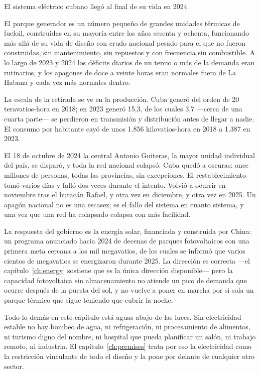 El sistema eléctrico cubano llegó al final de su vida en 2024.

El parque generador es un número pequeño de grandes unidades térmicas de fueloil,
construidas en su mayoría entre los años sesenta y ochenta, funcionando más allá de
su vida de diseño con crudo nacional pesado para el que no fueron construidas, sin
mantenimiento, sin repuestos y con frecuencia sin combustible. A lo largo de 2023 y
2024 los déficits diarios de un tercio o más de la demanda eran rutinarios, y los
apagones de doce a veinte horas eran normales fuera de La Habana y cada vez más
normales dentro.

La escala de la retirada se ve en la producción. Cuba generó del orden de 20
teravatios-hora en 2018; en 2023 generó 15,3, de los cuales 3,7 ---cerca de una
cuarta parte--- se perdieron en transmisión y distribución antes de llegar a
nadie.\unv{} El consumo por habitante cayó de unos 1.856 kilovatios-hora en 2018 a
1.387 en 2023.

El 18 de octubre de 2024 la central Antonio Guiteras, la mayor unidad individual del
país, se disparó, y toda la red nacional colapsó. Cuba quedó a oscuras: once
millones de personas, todas las provincias, sin excepciones. El restablecimiento
tomó varios días y falló dos veces durante el intento. Volvió a ocurrir en
noviembre tras el huracán Rafael, y otra vez en diciembre, y otra vez en
2025.\unv{} Un apagón nacional no es una escasez; es el fallo del sistema en cuanto
sistema, y una vez que una red ha colapsado colapsa con más facilidad.

La respuesta del gobierno es la energía solar, financiada y construida por China: un
programa anunciado hacia 2024 de decenas de parques fotovoltaicos con una primera
meta cercana a los mil megavatios, de los cuales se informó que varios cientos de
megavatios se energizaron durante 2025.\unv{} La dirección es correcta ---el
capítulo~\ref{ch:energy} sostiene que es la única dirección disponible--- pero la
capacidad fotovoltaica sin almacenamiento no atiende un pico de demanda que ocurre
después de la puesta del sol, y no vuelve a poner en marcha por sí sola un parque
térmico que sigue teniendo que cubrir la noche.

Todo lo demás en este capítulo está aguas abajo de las luces. Sin electricidad
estable no hay bombeo de agua, ni refrigeración, ni procesamiento de alimentos, ni
turismo digno del nombre, ni hospital que pueda planificar un salón, ni trabajo
remoto, ni industria. El capítulo~\ref{ch:premises} trata por eso la electricidad
como la restricción vinculante de todo el diseño y la pone por delante de cualquier
otro sector.

